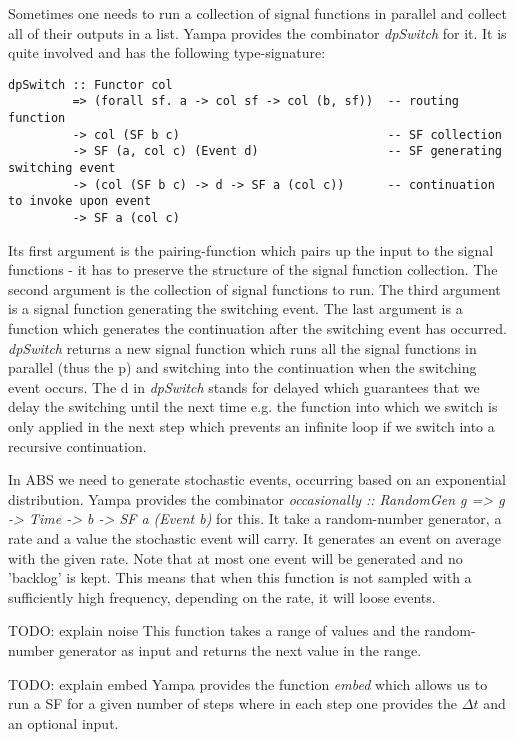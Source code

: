 Sometimes one needs to run a collection of signal functions in parallel and collect all of their outputs in a list. Yampa provides the combinator \textit{dpSwitch} for it. It is quite involved and has the following type-signature:

\begin{verbatim}
dpSwitch :: Functor col
         => (forall sf. a -> col sf -> col (b, sf))  -- routing function
         -> col (SF b c)                             -- SF collection
         -> SF (a, col c) (Event d)                  -- SF generating switching event
         -> (col (SF b c) -> d -> SF a (col c))      -- continuation to invoke upon event
         -> SF a (col c)
\end{verbatim}

Its first argument is the pairing-function which pairs up the input to the signal functions - it has to preserve the structure of the signal function collection. The second argument is the collection of signal functions to run. The third argument is a signal function generating the switching event. The last argument is a function which generates the continuation after the switching event has occurred. \textit{dpSwitch} returns a new signal function which runs all the signal functions in parallel (thus the p) and switching into the continuation when the switching event occurs. The d in \textit{dpSwitch} stands for delayed which guarantees that we delay the switching until the next time e.g. the function into which we switch is only applied in the next step which prevents an infinite loop if we switch into a recursive continuation.

In ABS we need to generate stochastic events, occurring based on an exponential distribution. Yampa provides the combinator \textit{occasionally :: RandomGen g => g -> Time -> b -> SF a (Event b)} for this. It take a random-number generator, a rate and a value the stochastic event will carry. It generates an event on average with the given rate. Note that at most one event will be generated and no 'backlog' is kept. This means that when this function is not sampled with a sufficiently high frequency, depending on the rate, it will loose events.

TODO: explain noise
This function takes a range of values and the random-number generator as input and returns the next value in the range.

TODO: explain embed
Yampa provides the function \textit{embed} which allows us to run a SF for a given number of steps where in each step one provides the $\Delta t$ and an optional input.

